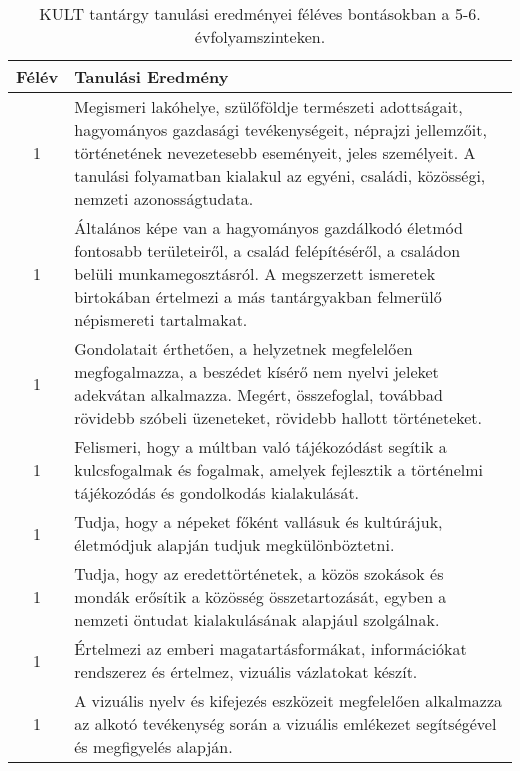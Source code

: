        
           \begin{longtable}{c | p{12cm} }
            \caption[KULT 5-6.]{KULT tantárgy tanulási eredményei féléves bontásokban a 5-6. évfolyamszinteken. }  \\

            \textbf{Félév} & \textbf{Tanulási Eredmény} \\
            \hline
            \endhead
                                
                                      
                                
                                          1 &  Megismeri lakóhelye, szülőföldje természeti adottságait, hagyományos gazdasági tevékenységeit, néprajzi jellemzőit, történetének nevezetesebb eseményeit, jeles személyeit. A tanulási folyamatban kialakul az egyéni, családi, közösségi, nemzeti azonosságtudata. \\ \hline
                                          1 &  Általános képe van a hagyományos gazdálkodó életmód fontosabb területeiről, a család felépítéséről, a családon belüli munkamegosztásról. A megszerzett ismeretek birtokában értelmezi a más tantárgyakban felmerülő népismereti tartalmakat. \\ \hline
                                          1 &  Gondolatait érthetően, a helyzetnek megfelelően megfogalmazza, a beszédet kísérő nem nyelvi jeleket adekvátan alkalmazza. Megért, összefoglal, továbbad rövidebb szóbeli üzeneteket, rövidebb hallott történeteket. \\ \hline
                                          1 &  Felismeri, hogy a múltban való tájékozódást segítik a kulcsfogalmak és fogalmak, amelyek fejlesztik a történelmi tájékozódás és gondolkodás kialakulását. \\ \hline
                                          1 &  Tudja, hogy a népeket főként vallásuk és kultúrájuk, életmódjuk alapján tudjuk megkülönböztetni. \\ \hline
                                          1 &  Tudja, hogy az eredettörténetek, a közös szokások és mondák erősítik a közösség összetartozását, egyben a nemzeti öntudat kialakulásának alapjául szolgálnak. \\ \hline
                                          1 &  Értelmezi az emberi magatartásformákat, információkat rendszerez és értelmez, vizuális vázlatokat készít. \\ \hline
                                          1 &  A vizuális nyelv és kifejezés eszközeit megfelelően alkalmazza az alkotó tevékenység során a vizuális emlékezet segítségével és megfigyelés alapján. \\ \hline

\end{longtable}
